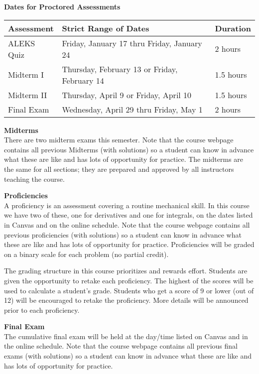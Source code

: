 \documentclass[12pt]{article}
\renewcommand{\emph}[1]{\textsf{\textbf{#1}}}
\newcommand{\localhead}[1]{\par\smallskip\textbf{#1}\nobreak\\}%
\def\heading#1{\localhead{\large\emph{#1}}}
\begin{document}
\heading{Dates for Proctored Assessments}
\begin{center}
\begin{tabular}{| l | l | l |}
\hline
Assessment & Strict Range of Dates & Duration \\
\hline \hline
ALEKS Quiz & Friday, January 17 thru Friday, January 24 & 2 hours\\
\hline
Midterm I & Thursday, February 13 or Friday, February 14 & 1.5 hours \\
\hline
Midterm II & Thursday, April 9 or Friday, April 10 & 1.5 hours \\
\hline
Final Exam & Wednesday, April 29 thru Friday, May 1 & 2 hours \\
\hline
\end{tabular}
\end{center}

\heading{Midterms}
There are two midterm exams this semester. Note that the course webpage contains all previous Midterms (with solutions) so a student can know in advance what these are like and has lots of opportunity for practice. The midterms are the same for all sections; they are prepared and approved by all instructors teaching the course.
 
\heading{Proficiencies}
A proficiency is an assessment covering a routine mechanical skill.  In this course we have two of these, one for derivatives and one for integrals, on the dates listed in Canvas and on the online schedule. Note that the course webpage contains all previous proficiencies (with solutions) so a student can know in advance what these are like and has lots of opportunity for practice. Proficiencies will be graded on a binary scale for each problem (no partial credit).  

The grading structure in this course prioritizes and rewards effort. Students are given the opportunity to retake each proficiency. The highest of the scores will be used to calculate a student's grade. Students who get a score of 9 or lower (out of 12) will be encouraged to retake the proficiency. More details will be announced prior to each proficiency.

\heading{Final Exam} 
The cumulative final exam will be held at the day/time listed on Canvas and in the online schedule. Note that the course webpage contains all previous final exams (with solutions) so a student can know in advance what these are like  and has lots of opportunity for practice.
\end{document}
